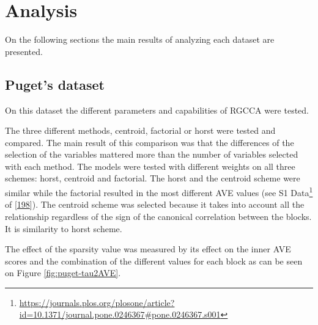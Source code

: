 \documentclass[
  a4paper,
]{book}
\DeclareRobustCommand{\href}[2]{#2\footnote{\url{#1}}}
\begin{document}
\hypertarget{analysis}{%
\section{Analysis}\label{analysis}}

On the following sections the main results of analyzing each dataset are presented.

\hypertarget{results-puget}{%
\subsection{Puget's dataset}\label{results-puget}}

On this dataset the different parameters and capabilities of RGCCA were tested.

The three different methods, centroid, factorial or horst were tested and compared.
The main result of this comparison was that the differences of the selection of the variables mattered more than the number of variables selected with each method.
The models were tested with different weights on all three schemes: horst, centroid and factorial.
The horst and the centroid scheme were similar while the factorial resulted in the most different AVE values (see \href{https://journals.plos.org/plosone/article?id=10.1371/journal.pone.0246367\#pone.0246367.s001}{S1 Data} of {[}\protect\hyperlink{ref-revilla2021}{198}{]}).
The centroid scheme was selected because it takes into account all the relationship regardless of the sign of the canonical correlation between the blocks.
It is similarity to horst scheme.

The effect of the sparsity value was measured by its effect on the inner AVE scores and the combination of the different values for each block as can be seen on Figure \ref{fig:puget-tau2AVE}.
\end{document}
